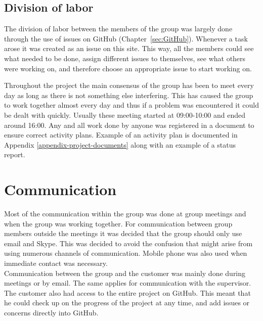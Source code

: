 \subsection{Division of labor}
The division of labor between the members of the group was largely done through the use of issues on GitHub (Chapter~\ref{sec:GitHub}). Whenever a task arose it was created as an issue on this site. This way, all the members could see what needed to be done, assign different issues to themselves, see what others were working on, and therefore choose an appropriate issue to start working on.

Throughout the project the main consensus of the group has been to meet every day as long as there is not something else interfering. This has caused the group to work together almost every day and thus if a problem was encountered it could be dealt with quickly. Usually these meeting started at 09:00-10:00 and ended around 16:00. Any and all work done by anyone was registered in a document to ensure correct activity plans. Example of an activity plan is documented in Appendix \ref{appendix-project-documents} along with an example of a status report.

\section{Communication}
\label{communication}
Most of the communication within the group was done at group meetings and when the group was working together. For communication between group members outside the meetings it was decided that the group should only use email and Skype. This was decided to avoid the confusion that might arise from using numerous channels of communication. Mobile phone was also used when immediate contact was necessary.\\
\newline
Communication between the group and the customer was mainly done during meetings or by email. The same applies for communication with the supervisor. The customer also had access to the entire project on GitHub. This meant that he could check up on the progress of the project at any time, and add issues or concerns directly into GitHub.

